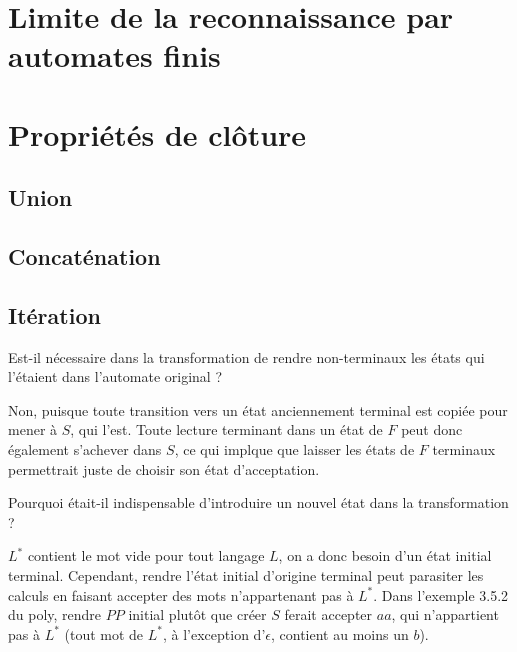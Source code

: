 \section{Limite de la reconnaissance par automates finis}

\section{Propriétés de clôture}
\label{cloture}
\subsection{Union}

\subsection{Concaténation}

\subsection{Itération}

\begin{exercice}
Est-il nécessaire dans la transformation de rendre non-terminaux les états qui l'étaient dans l'automate original ?
\end{exercice}

\begin{correction*}
Non, puisque toute transition vers un état anciennement terminal est copiée pour mener à $S$, qui l'est. Toute lecture terminant dans un état de $F$ peut donc également s'achever dans $S$, ce qui implque que laisser les états de $F$ terminaux permettrait juste de choisir son état d'acceptation.
\end{correction*}

\begin{exercice}
Pourquoi était-il indispensable d'introduire un nouvel état dans la transformation ?
\end{exercice}

\begin{correction*}
$L^*$ contient le mot vide pour tout langage $L$, on a donc besoin d'un état initial terminal. Cependant, rendre l'état initial d'origine terminal peut parasiter les calculs en faisant accepter des mots n'appartenant pas à $L^*$. Dans l'exemple 3.5.2 du poly, rendre $PP$ initial plutôt que créer $S$ ferait accepter $aa$, qui n'appartient pas à $L^*$ (tout mot de $L^*$, à l'exception d'$\epsilon$, contient au moins un $b$).   
\end{correction*}

